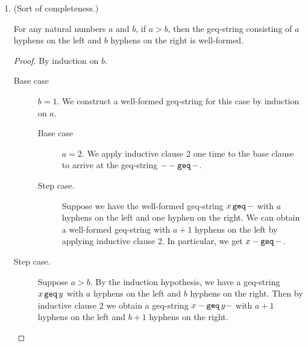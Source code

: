 \documentclass[11pt,letterpaper]{article}
\begin{document}
\begin{enumerate}
    \item (Sort of completeness.)

        \begin{prop}
            For any natural numbers $a$ and $b$, if $a > b$, then the
            geq-string consisting of $a$ hyphens on the left and $b$ hyphens on
            the right is well-formed.
        \end{prop}

        \begin{proof}
            By induction on $b$.

            \begin{description}
                \item[Base case] $b = 1$.
                    We construct a well-formed geq-string for this case by
                    induction on $a$.

                    \begin{description}
                        \item[Base case] $a = 2$.
                            We apply inductive clause 2 one time to the base
                            clause to arrive at the geq-string $-- \operatorname{\mathtt{geq}} -$.

                        \item[Step case.]
                            Suppose we have the well-formed geq-string
                            $x \operatorname{\mathtt{geq}} -$ with $a$ hyphens on the left and one
                            hyphen on the right.
                            We can obtain a well-formed geq-string with $a+1$
                            hyphens on the left by applying inductive clause 2.
                            In particular, we get $x- \operatorname{\mathtt{geq}} -$.
                    \end{description}

                \item[Step case.]
                    Suppose $a > b$.
                    By the induction hypothesis, we have a geq-string
                    $x \operatorname{\mathtt{geq}} y$ with $a$ hyphens on the left and $b$ hyphens
                    on the right.
                    Then by inductive clause 2 we obtain a
                    geq-string $x- \operatorname{\mathtt{geq}} y-$ with $a+1$ hyphens on the left
                    and $b+1$ hyphens on the right.
            \end{description}


\end{proof}
\end{enumerate}
\end{document}
